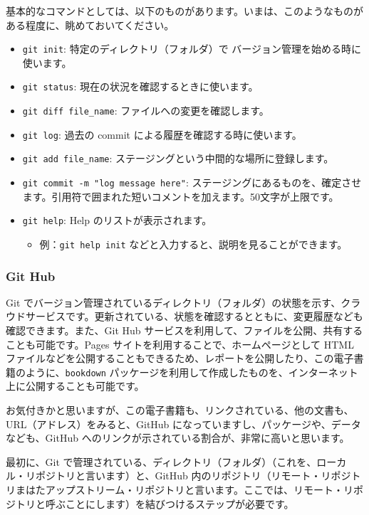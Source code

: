 \documentclass[
  xelatex, ja=standard]{bxjsbook}
\providecommand{\tightlist}{%
  \setlength{\itemsep}{0pt}\setlength{\parskip}{0pt}}
\theoremstyle{definition}
\theoremstyle{definition}
\theoremstyle{definition}
\theoremstyle{definition}
\theoremstyle{remark}
\begin{document}
基本的なコマンドとしては、以下のものがあります。いまは、このようなものがある程度に、眺めておいてください。

\begin{itemize}
\tightlist
\item
  \texttt{git\ init}: 特定のディレクトリ（フォルダ）で バージョン管理を始める時に使います。
\item
  \texttt{git\ status}: 現在の状況を確認するときに使います。
\item
  \texttt{git\ diff\ file\_name}: ファイルへの変更を確認します。
\item
  \texttt{git\ log}: 過去の commit による履歴を確認する時に使います。
\item
  \texttt{git\ add\ file\_name}: ステージングという中間的な場所に登録します。
\item
  \texttt{git\ commit\ -m\ "log\ message\ here"}: ステージングにあるものを、確定させます。引用符で囲まれた短いコメントを加えます。50文字が上限です。
\item
  \texttt{git\ help}: Help のリストが表示されます。

  \begin{itemize}
  \tightlist
  \item
    例：\texttt{git\ help\ init} などと入力すると、説明を見ることができます。
  \end{itemize}
\end{itemize}

\hypertarget{git-hub}{%
\subsubsection{Git Hub}\label{git-hub}}

Git でバージョン管理されているディレクトリ（フォルダ）の状態を示す、クラウドサービスです。更新されている、状態を確認するとともに、変更履歴なども確認できます。また、Git Hub サービスを利用して、ファイルを公開、共有することも可能です。Pages サイトを利用することで、ホームページとして HTML ファイルなどを公開することもできるため、レポートを公開したり、この電子書籍のように、\texttt{bookdown} パッケージを利用して作成したものを、インターネット上に公開することも可能です。

お気付きかと思いますが、この電子書籍も、リンクされている、他の文書も、URL（アドレス）をみると、GitHub になっていますし、パッケージや、データなども、GitHub へのリンクが示されている割合が、非常に高いと思います。

最初に、Git で管理されている、ディレクトリ（フォルダ）（これを、ローカル・リポジトリと言います）と、GitHub 内のリポジトリ（リモート・リポジトリまはたアップストリーム・リポジトリと言います。ここでは、リモート・リポジトリと呼ぶことにします）を結びつけるステップが必要です。
\end{document}
